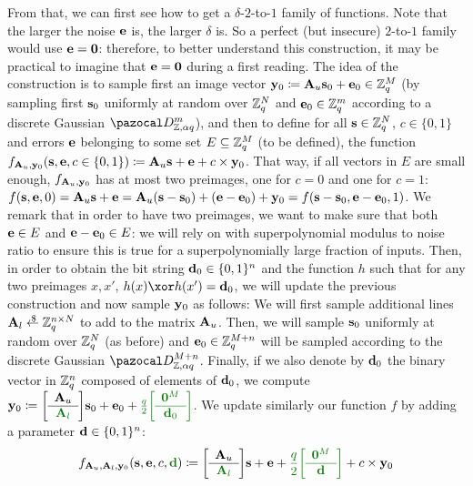 From that, we can first see how to get a $\delta$-$2$-to-$1$ family of functions. Note that the larger the noise $\mathbf{e}$ is, the larger $\delta$ is. So a perfect (but insecure) $2$-to-$1$ family would use $\mathbf{e}=\mathbf{0}$: therefore, to better understand this construction, it may be practical to imagine that $\mathbf{e}=\mathbf{0}$ during a first reading. The idea of the construction is to sample first an image vector $\mathbf{y}_0 \coloneqq \mathbf{A}_u \mathbf{s}_0 + \mathbf{e}_0 \in \mathbb{Z}_q^M$ (by sampling first $\mathbf{s}_0$ uniformly at random over $\mathbb{Z}_q^N$ and $\mathbf{e}_0 \in \mathbb{Z}_q^m$ according to a discrete Gaussian $\cD_{\Z, \alpha q}^m$), and then to define for all $\mathbf{s} \in \mathbb{Z}_q^N$, $c \in \{0,1\}$ and errors $\mathbf{e}$ belonging to some set $E \subseteq \mathbb{Z}_q^M$ (to be defined), the function $f_{\mathbf{A}_u,\mathbf{y}_0}(\mathbf{s}, \mathbf{e} ,c \in \{0,1\}) \coloneqq \mathbf{A}_u \mathbf{s} + \mathbf{e} + c \times \mathbf{y}_0$. That way, if all vectors in $E$ are small enough, $f_{\mathbf{A}_u,\mathbf{y}_0}$ has at most two preimages, one for $c=0$ and one for $c=1$: $f(\mathbf{s},\mathbf{e},0) = \mathbf{A}_u \mathbf{s}+\mathbf{e} = \mathbf{A}_u(\mathbf{s}-\mathbf{s}_0) + (\mathbf{e}-\mathbf{e}_0) + \mathbf{y}_0 = f(\mathbf{s}-\mathbf{s}_0,\mathbf{e}-\mathbf{e}_0,1)$. We remark that in order to have two preimages, we want to make sure that both $\mathbf{e} \in E$ and $\mathbf{e}-\mathbf{e}_0 \in E$: we will rely on \LWE{} with superpolynomial modulus to noise ratio to ensure this is true for a superpolynomially large fraction of inputs. Then, in order to obtain the bit string $\mathbf{d}_0 \in \{0,1\}^n$ and the function $h$ such that for any two preimages $x,x'$, $h(x) \xor h(x')=\vect{d}_0$, we will
update the previous construction and now sample $\mathbf{y}_0$ as follows: We will first sample additional lines $\vect{A}_l \sample \Z_q^{n \times N}$
to add to the matrix $\mathbf{A}_u$. Then, we will sample $\mathbf{s}_0$ uniformly at random over $\mathbb{Z}_q^N$ (as before) and $\mathbf{e}_0 \in \mathbb{Z}_q^{M+n}$ will be sampled according to the discrete Gaussian $\cD_{\Z, \alpha q}^{M+n}$. Finally, if we also denote by $\mathbf{d}_0$ the binary vector in $\mathbb{Z}_q^n$ composed of elements of $\mathbf{d}_0$, we compute $\vect{y}_0 \eqdef \SmallBlockMatrix{\vect{A}_u}{\highlightChanges{\vect{A}_l}} \vect{s}_0+\vect{e}_0+\highlightChanges{\frac{q}{2} \SmallBlockMatrix{\vect{0}^M}{\vect{d}_0}}$. We update similarly our function $f$ by adding a parameter $\mathbf{d} \in \{0,1\}^n$:
\begin{align}
f_{\vect{A}_u,\vect{A}_l,\vect{y}_0}(\vect{s},\vect{e},c,\highlightChanges{\vect{d}}) \eqdef \SmallBlockMatrix{\vect{A}_u}{\highlightChanges{\vect{A}_l}} \vect{s} + \vect{e} + \highlightChanges{\frac{q}{2} \SmallBlockMatrix{\vect{0}^M}{\vect{d}}} + c \times \vect{y}_0
\end{align}
